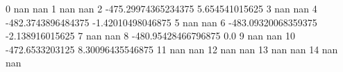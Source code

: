 0 nan nan
1 nan nan
2 -475.29974365234375 5.654541015625
3 nan nan
4 -482.3743896484375 -1.42010498046875
5 nan nan
6 -483.09320068359375 -2.138916015625
7 nan nan
8 -480.95428466796875 0.0
9 nan nan
10 -472.6533203125 8.30096435546875
11 nan nan
12 nan nan
13 nan nan
14 nan nan
